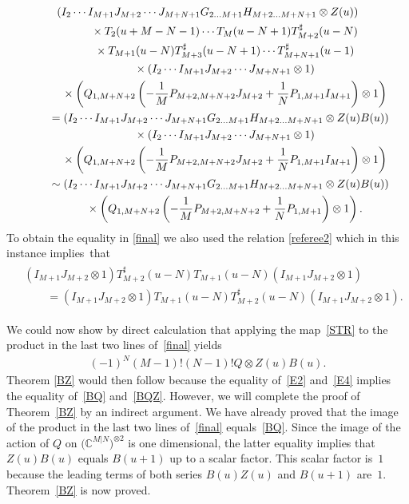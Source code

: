 \documentclass[10pt,a4paper]{amsart}
\numberwithin{equation}{section}
\def\CC{{\mathbb{C}}}
\def\CMN{\CC^{M|N}}
\def\ot{\otimes}
\def\TS{T^{\sharp}}
\begin{document}
\begin{gather}
( I_{2} \cdots I_{M+1}
J_{M+2} \cdots J_{M+N+1}
G_{2 \dots M+1} H_{M+2 \dots M+N+1}\ot Z(u) )\notag
\\ \qquad\quad{} \times
T_2 (u+M-N-1) \cdots T_{M} (u-N+1)
\TS_{M+2} (u-N)\notag
\\ \qquad\quad{} \times
T_{M+1} (u-N)
\TS_{M+3} (u-N+1) \cdots \TS_{M+N+1} (u-1)\notag
\\ \qquad\quad{} \times
( I_{2} \cdots I_{M+1}
J_{M+2} \cdots J_{M+N+1}\ot1 )\notag
\\ \qquad\quad{} \times
\left( Q_{1,M+N+2}
\left(- \frac1M P_{M+2,M+N+2} J_{M+2}+
\frac1N P_{1,M+1} I_{M+1} \right)\ot1 \right) \notag
\\ \qquad{} =
( I_{2} \cdots I_{M+1}
J_{M+2} \cdots J_{M+N+1}
G_{2 \dots M+1} H_{M+2 \dots M+N+1}\ot
Z(u) B(u) )\notag
\\ \qquad\quad{} \times
( I_{2} \cdots I_{M+1}
J_{M+2} \cdots J_{M+N+1}\ot1 )\notag
\\ \qquad\quad{}\times
\left( Q_{1,M+N+2}
\left(- \frac1M P_{M+2,M+N+2} J_{M+2}+
\frac1N P_{1,M+1} I_{M+1} \right)\ot1 \right)\notag
\\ \qquad{} \sim
( I_{2} \cdots I_{M+1}
J_{M+2} \cdots J_{M+N+1}
G_{2 \dots M+1} H_{M+2 \dots M+N+1}\ot
Z(u) B(u) )\notag
\\ \qquad\quad{} \times
\left( Q_{1,M+N+2}
\left(- \frac1M P_{M+2,M+N+2}+
\frac1N P_{1,M+1} \right)\ot1 \right) . \label{final}
\end{gather}
To obtain the equality in \eqref{final} we also used the relation
\eqref{referee2} which in this instance implies~that
\begin{gather*}
\begin{split}&
( I_{M+1} J_{M+2}\ot1 )\TS_{M+2} (u-N) T_{M+1} (u-N)
( I_{M+1} J_{M+2}\ot1 )\\
& \qquad{} =( I_{M+1} J_{M+2}\ot1 )
T_{M+1} (u-N) \TS_{M+2} (u-N)
( I_{M+1} J_{M+2}\ot1 ) .
\end{split}
\end{gather*}

We could now show by direct calculation that applying the map~\eqref{STR}
to the product in the last two lines of~\eqref{final} yields
\begin{gather}\label{BQZ}
(-1)^N (M-1) ! (N-1) ! Q\ot Z(u) B(u) .
\end{gather}
Theorem \ref{BZ}  would then follow because the equality of~\eqref{E2} and~\eqref{E4} implies the equality of~\eqref{BQ} and~\eqref{BQZ}. However, we will complete the proof of Theorem~\ref{BZ} by an indirect
argument. We have already proved that the image of the product in
the last two lines of~\eqref{final} equals~\eqref{BQ}.
Since the image of the action of $Q$ on $\big(\CMN\big)^{\ot 2}$
is one dimensional, the latter equality implies that $Z(u) B(u)$ equals $B(u+1)$ up to a scalar factor.
This scalar factor is~$1$ because the leading terms of both
series $B(u) Z(u)$ and $B(u+1)$ are~$1$. Theorem~\ref{BZ} is now proved.
\end{document}
